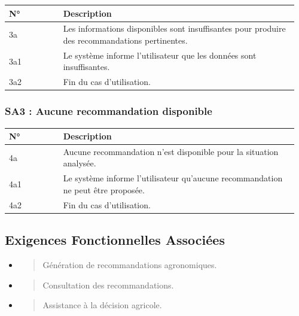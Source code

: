 \begin{longtable}{@{}p{0.18\linewidth}p{0.78\linewidth}@{}}
\toprule
\rowcolors{2}{gray!10}{white}
\textbf{N°} & \textbf{Description} \\
\midrule
\endhead
3a & Les informations disponibles sont insuffisantes pour produire des
recommandations pertinentes. \\
3a1 & Le système informe l'utilisateur que les données sont
insuffisantes. \\
3a2 & Fin du cas d'utilisation. \\
\bottomrule
\end{longtable}

\hypertarget{sa3-aucune-recommandation-disponible}{%
\subsubsection{SA3 : Aucune recommandation
disponible}\label{sa3-aucune-recommandation-disponible}}

\begin{longtable}{@{}p{0.18\linewidth}p{0.78\linewidth}@{}}
\toprule
\rowcolors{2}{gray!10}{white}
\textbf{N°} & \textbf{Description} \\
\midrule
\endhead
4a & Aucune recommandation n'est disponible pour la situation
analysée. \\
4a1 & Le système informe l'utilisateur qu'aucune recommandation ne peut
être proposée. \\
4a2 & Fin du cas d'utilisation. \\
\bottomrule
\end{longtable}

\hypertarget{exigences-fonctionnelles-associuxe9es-4}{%
\subsection{Exigences Fonctionnelles
Associées}\label{exigences-fonctionnelles-associuxe9es-4}}

\begin{itemize}
\item
  \begin{quote}
  Génération de recommandations agronomiques.
  \end{quote}
\item
  \begin{quote}
  Consultation des recommandations.
  \end{quote}
\item
  \begin{quote}
  Assistance à la décision agricole.
  \end{quote}
\end{itemize}

